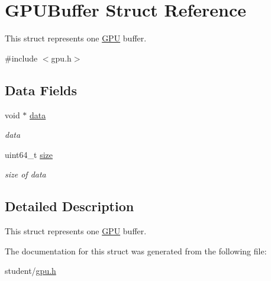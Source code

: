 \hypertarget{structGPUBuffer}{}\section{G\+P\+U\+Buffer Struct Reference}
\label{structGPUBuffer}


This struct represents one \hyperlink{structGPU}{G\+PU} buffer.  




{\ttfamily \#include $<$gpu.\+h$>$}

\subsection*{Data Fields}
\begin{DoxyCompactItemize}
\item 
\mbox{\label{structGPUBuffer_a7f96bfd9957ec727266b89f077d9be55}} 
void $\ast$ \hyperlink{structGPUBuffer_a7f96bfd9957ec727266b89f077d9be55}{data}
\begin{DoxyCompactList}\small\item\em data \end{DoxyCompactList}\item 
\mbox{\label{structGPUBuffer_a19311d7505b124015f231fc37fae04c7}} 
uint64\+\_\+t \hyperlink{structGPUBuffer_a19311d7505b124015f231fc37fae04c7}{size}
\begin{DoxyCompactList}\small\item\em size of data \end{DoxyCompactList}\end{DoxyCompactItemize}


\subsection{Detailed Description}
This struct represents one \hyperlink{structGPU}{G\+PU} buffer. 

The documentation for this struct was generated from the following file\+:\begin{DoxyCompactItemize}
\item 
student/\hyperlink{gpu_8h}{gpu.\+h}\end{DoxyCompactItemize}
